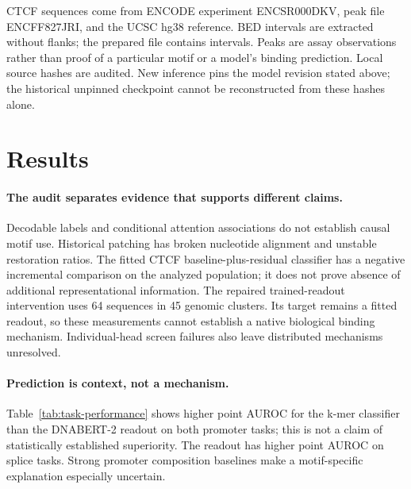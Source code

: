 CTCF sequences come from ENCODE experiment ENCSR000DKV, peak file ENCFF827JRI, and the UCSC hg38 reference. BED intervals are extracted without flanks; the prepared file contains \CTCFSequences{} intervals. Peaks are assay observations rather than proof of a particular motif or a model's binding prediction. Local source hashes are audited. New inference pins the model revision stated above; the historical unpinned checkpoint cannot be reconstructed from these hashes alone.

\section{Results}
\paragraph{The audit separates evidence that supports different claims.}
Decodable labels and conditional attention associations do not establish causal motif use. Historical patching has broken nucleotide alignment and unstable restoration ratios. The fitted CTCF baseline-plus-residual classifier has a negative incremental comparison on the analyzed population; it does not prove absence of additional representational information. The repaired trained-readout intervention uses 64 sequences in 45 genomic clusters. Its target remains a fitted readout, so these measurements cannot establish a native biological binding mechanism. Individual-head screen failures also leave distributed mechanisms unresolved.
\paragraph{Prediction is context, not a mechanism.}
Table~\ref{tab:task-performance} shows higher point AUROC for the k-mer classifier than the DNABERT-2 readout on both promoter tasks; this is not a claim of statistically established superiority. The readout has higher point AUROC on splice tasks. Strong promoter composition baselines make a motif-specific explanation especially uncertain.
\begin{table}[t]
\centering\footnotesize\setlength{\tabcolsep}{3pt}
\caption{Held-out AUROC with 95\% sequence-bootstrap intervals, generated from saved per-sequence predictions.}
\label{tab:task-performance}
\PerformanceTable
\end{table}

